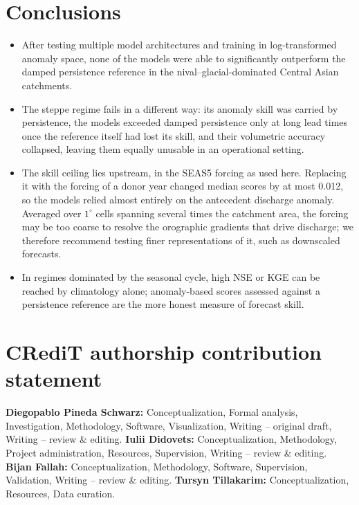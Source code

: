 \documentclass[review,12pt,authoryear]{elsarticle}
\begin{document}
\section{Conclusions}
\label{sec:conclusions}

\begin{itemize}
\item After testing multiple model architectures and training in log-transformed anomaly space, none of the models were able to significantly outperform the damped persistence reference in the nival--glacial-dominated Central Asian catchments.
\item The steppe regime fails in a different way: its anomaly skill was carried by persistence, the models exceeded damped persistence only at long lead times once the reference itself had lost its skill, and their volumetric accuracy collapsed, leaving them equally unusable in an operational setting.
\item The skill ceiling lies upstream, in the SEAS5 forcing as used here. Replacing it with the forcing of a donor year changed median scores by at most 0.012, so the models relied almost entirely on the antecedent discharge anomaly. Averaged over $1^\circ$ cells spanning several times the catchment area, the forcing may be too coarse to resolve the orographic gradients that drive discharge; we therefore recommend testing finer representations of it, such as downscaled forecasts.
\item In regimes dominated by the seasonal cycle, high NSE or KGE can be reached by climatology alone; anomaly-based scores assessed against a persistence reference are the more honest measure of forecast skill.
\end{itemize}

\section*{CRediT authorship contribution statement}

\textbf{Diegopablo Pineda Schwarz:} Conceptualization, Formal analysis, Investigation, Methodology, Software, Visualization, Writing -- original draft, Writing -- review \& editing. \textbf{Iulii Didovets:} Conceptualization, Methodology, Project administration, Resources, Supervision, Writing -- review \& editing. \textbf{Bijan Fallah:} Conceptualization, Methodology, Software, Supervision, Validation, Writing -- review \& editing. \textbf{Tursyn Tillakarim:} Conceptualization, Resources, Data curation.
\end{document}
